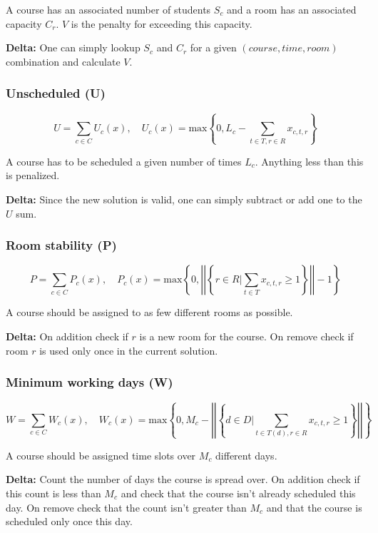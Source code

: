 A course has an associated number of students $S_c$ and a room has an associated capacity $C_r$. $V$ is the penalty for exceeding this capacity.

\textbf{Delta: } One can simply lookup $S_c$ and $C_r$ for a given $(course, time, room)$ combination and calculate $V$.

\subsubsection{Unscheduled (U)}
\begin{equation}
U = \sum_{c \in C} U_c(x), \quad U_c(x) = \mathrm{max}\left\{ 0, L_c - \sum_{t \in T, r \in R} x_{c, t, r}\right\}
\end{equation}

A course has to be scheduled a given number of times $L_c$. Anything less than this is penalized.

\textbf{Delta: } Since the new solution is valid, one can simply subtract or add one to the $U$ sum.

\subsubsection{Room stability (P)}
\begin{equation}
P = \sum_{c \in C} P_c(x), \quad P_c(x) = \mathrm{max}\left\{ 0, \left|\left| \left\{ r \in R \Big\vert \sum_{t \in T} x_{c, t, r} \ge 1 \right\} \right|\right| - 1 \right\}
\end{equation}

A course should be assigned to as few different rooms as possible.

\textbf{Delta: } On addition check if $r$ is a new room for the course. On remove check if room $r$ is used only once in the current solution.

\subsubsection{Minimum working days (W)}
\begin{equation*}
W = \sum_{c \in C} W_c(x), \quad W_c(x) = \mathrm{max}\left\{ 0, M_c - \left|\left| \left\{ d \in D \Big\vert \sum_{t \in T(d), r \in R} x_{c, t, r} \ge 1 \right\} \right|\right| \right\}
\end{equation*}

A course should be assigned time slots over $M_c$ different days.

\textbf{Delta: } Count the number of days the course is spread over. On addition check if this count is less than $M_c$ and check that the course isn't already scheduled this day. On remove check that the count isn't greater than $M_c$ and that the course is scheduled only once this day.

